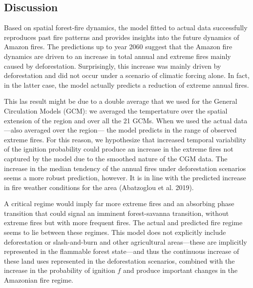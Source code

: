 \documentclass[
]{article}
\begin{document}
\subsection{Discussion}\label{discussion}

Based on spatial forest-fire dynamics, the model fitted to actual data
successfully reproduces past fire patterns and provides insights into
the future dynamics of Amazon fires. The predictions up to year 2060
suggest that the Amazon fire dynamics are driven to an increase in total
annual and extreme fires mainly caused by deforestation. Surprisingly,
this increase was mainly driven by deforestation and did not occur under
a scenario of climatic forcing alone. In fact, in the latter case, the
model actually predicts a reduction of extreme annual fires.

This las result might be due to a double average that we used for the
General Circulation Models (GCM): we averaged the tempertature over the
spatial extension of the region and over all the 21 GCMs. When we used
the actual data ---also averaged over the region--- the model predicts
in the range of observed extreme fires. For this reason, we hypothesize
that increased temporal variability of the ignition probability could
produce an increase in the extreme fires not captured by the model due
to the smoothed nature of the CGM data. The increase in the median
tendency of the annual fires under deforestation scenarios seems a more
robust prediction, however. It is in line with the predicted increase in
fire weather conditions for the area (Abatzoglou et al. 2019).

A critical regime would imply far more extreme fires and an absorbing
phase transition that could signal an imminent forest-savanna
transition, without extreme fires but with more frequent fires. The
actual and predicted fire regime seems to lie between these regimes.
This model does not explicitly include deforestation or slash-and-burn
and other agricultural areas---these are implicitly represented in the
flammable forest state---and thus the continuous increase of these land
uses represented in the deforestation scenarios, combined with the
increase in the probability of ignition \(f\) and produce important
changes in the Amazonian fire regime.
\end{document}
